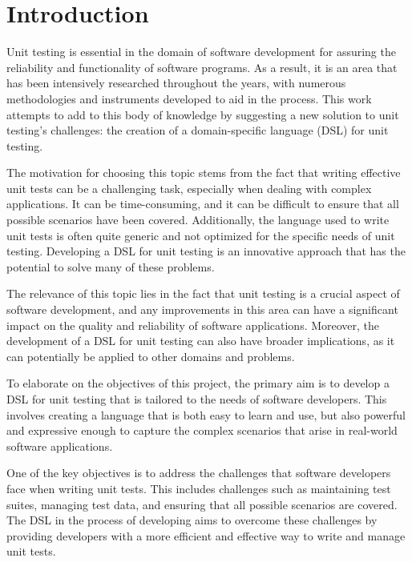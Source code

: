 \chapter*{Introduction}

Unit testing is essential in the domain of software development for assuring the reliability and functionality of software programs. As a result, it is an area that has been intensively researched throughout the years, with numerous methodologies and instruments developed to aid in the process. This work attempts to add to this body of knowledge by suggesting a new solution to unit testing's challenges: the creation of a domain-specific language (DSL) for unit testing.

The motivation for choosing this topic stems from the fact that writing effective unit tests can be a challenging task, especially when dealing with complex applications. It can be time-consuming, and it can be difficult to ensure that all possible scenarios have been covered. Additionally, the language used to write unit tests is often quite generic and not optimized for the specific needs of unit testing. Developing a DSL for unit testing is an innovative approach that has the potential to solve many of these problems.

The relevance of this topic lies in the fact that unit testing is a crucial aspect of software development, and any improvements in this area can have a significant impact on the quality and reliability of software applications. Moreover, the development of a DSL for unit testing can also have broader implications, as it can potentially be applied to other domains and problems.

To elaborate on the objectives of this project, the primary aim is to develop a DSL for unit testing that is tailored to the needs of software developers. This involves creating a language that is both easy to learn and use, but also powerful and expressive enough to capture the complex scenarios that arise in real-world software applications.

One of the key objectives is to address the challenges that software developers face when writing unit tests. This includes challenges such as maintaining test suites, managing test data, and ensuring that all possible scenarios are covered. The DSL in the process of developing aims to overcome these challenges by providing developers with a more efficient and effective way to write and manage unit tests.

